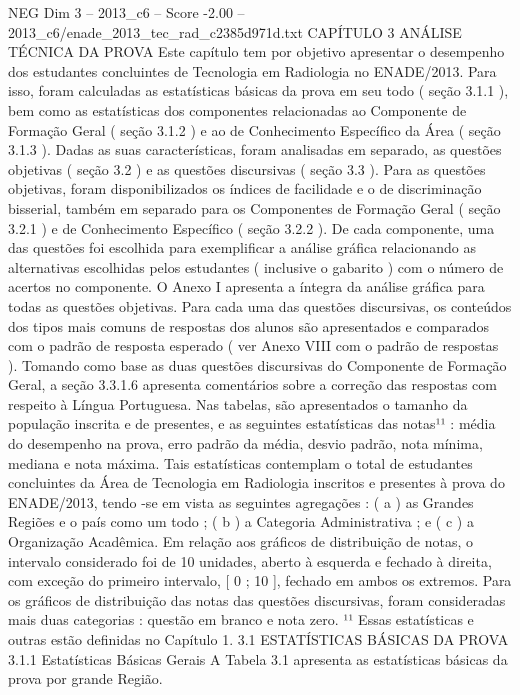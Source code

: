 \begin{textsample}{NEG Dim 3 – 2013\_c6 – Score -2.00 – 2013\_c6/enade\_2013\_tec\_rad\_c2385d971d.txt}  \label{ex:f3_neg_057}
CAPÍTULO 3 ANÁLISE TÉCNICA DA PROVA Este capítulo tem por objetivo apresentar o desempenho dos estudantes concluintes de Tecnologia em Radiologia no ENADE/2013.
Para isso, foram calculadas as estatísticas básicas da prova em seu todo ( seção 3.1.1 ), bem como as estatísticas dos componentes relacionadas ao Componente de Formação Geral ( seção 3.1.2 ) e ao de Conhecimento Específico da Área ( seção 3.1.3 ).
Dadas as suas características, foram analisadas em separado, as questões objetivas ( seção 3.2 ) e as questões discursivas ( seção 3.3 ).
Para as questões objetivas, foram disponibilizados os índices de facilidade e o de discriminação bisserial, também em separado para os Componentes de Formação Geral ( seção 3.2.1 ) e de Conhecimento Específico ( seção 3.2.2 ).
De cada componente, uma das questões foi escolhida para exemplificar a análise gráfica relacionando as alternativas escolhidas pelos estudantes ( inclusive o gabarito ) com o número de acertos no componente.
O Anexo I apresenta a íntegra da análise gráfica para todas as questões objetivas.
Para cada uma das questões discursivas, os conteúdos dos tipos mais comuns de respostas dos alunos são apresentados e comparados com o padrão de resposta esperado ( ver Anexo VIII com o padrão de respostas ).
Tomando como base as duas questões discursivas do Componente de Formação Geral, a seção 3.3.1.6 apresenta comentários sobre a correção das respostas com respeito à Língua Portuguesa.
Nas tabelas, são apresentados o tamanho da população inscrita e de presentes, e as seguintes estatísticas das notas¹¹ : média do desempenho na prova, erro padrão da média, desvio padrão, nota mínima, mediana e nota máxima.
Tais estatísticas contemplam o total de estudantes concluintes da Área de Tecnologia em Radiologia inscritos e presentes à prova do ENADE/2013, tendo -se em vista as seguintes agregações : ( a ) as Grandes Regiões e o país como um todo ; ( b ) a Categoria Administrativa ; e ( c ) a Organização Acadêmica.
Em relação aos gráficos de distribuição de notas, o intervalo considerado foi de 10 unidades, aberto à esquerda e fechado à direita, com exceção do primeiro intervalo, [ 0 ; 10 ], fechado em ambos os extremos.
Para os gráficos de distribuição das notas das questões discursivas, foram consideradas mais duas categorias : questão em branco e nota zero. ¹¹ Essas estatísticas e outras estão definidas no Capítulo 1. 3.1 ESTATÍSTICAS BÁSICAS DA PROVA 3.1.1 Estatísticas Básicas Gerais A Tabela 3.1 apresenta as estatísticas básicas da prova por grande Região.

\end{textsample}
